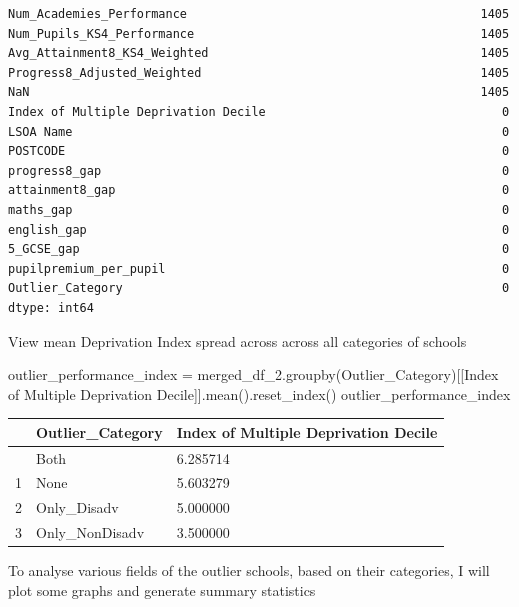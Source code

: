 \documentclass[
  letterpaper,
  DIV=11,
  numbers=noendperiod]{scrartcl}
\newenvironment{Shaded}{\begin{snugshade}}{\end{snugshade}}
\newcommand{\NormalTok}[1]{\textcolor[rgb]{0.00,0.23,0.31}{#1}}
\newcommand{\OperatorTok}[1]{\textcolor[rgb]{0.37,0.37,0.37}{#1}}
\newcommand{\StringTok}[1]{\textcolor[rgb]{0.13,0.47,0.30}{#1}}
\begin{document}
\begin{verbatim}
Num_Academies_Performance                                         1405
Num_Pupils_KS4_Performance                                        1405
Avg_Attainment8_KS4_Weighted                                      1405
Progress8_Adjusted_Weighted                                       1405
NaN                                                               1405
Index of Multiple Deprivation Decile                                 0
LSOA Name                                                            0
POSTCODE                                                             0
progress8_gap                                                        0
attainment8_gap                                                      0
maths_gap                                                            0
english_gap                                                          0
5_GCSE_gap                                                           0
pupilpremium_per_pupil                                               0
Outlier_Category                                                     0
dtype: int64
\end{verbatim}

View mean Deprivation Index spread across across all categories of
schools

\begin{Shaded}
\begin{Highlighting}[]
\NormalTok{outlier\_performance\_index }\OperatorTok{=}\NormalTok{ merged\_df\_2.groupby(}\StringTok{\textquotesingle{}Outlier\_Category\textquotesingle{}}\NormalTok{)[[}\StringTok{\textquotesingle{}Index of Multiple Deprivation Decile\textquotesingle{}}\NormalTok{]].mean().reset\_index()}
\NormalTok{outlier\_performance\_index}
\end{Highlighting}
\end{Shaded}

\begin{longtable}[]{@{}lll@{}}
\toprule\noalign{}
& Outlier\_Category & Index of Multiple Deprivation Decile \\
\midrule\noalign{}
\endhead
\bottomrule\noalign{}
\endlastfoot
0 & Both & 6.285714 \\
1 & None & 5.603279 \\
2 & Only\_Disadv & 5.000000 \\
3 & Only\_NonDisadv & 3.500000 \\
\end{longtable}

To analyse various fields of the outlier schools, based on their
categories, I will plot some graphs and generate summary statistics
\end{document}
